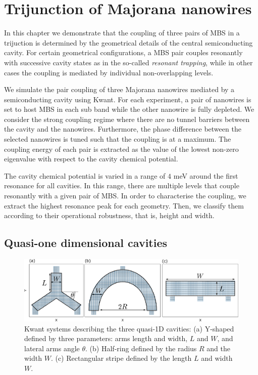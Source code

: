 \chapter{Trijunction of Majorana nanowires}

In this chapter we demonstrate that the coupling of three pairs of MBS in a trijuction is determined by the geometrical details of the central semiconducting cavity.
For certain geometrical configurations, a MBS pair couples resonantly with successive cavity states as in the so-called \textit{resonant trapping}, while in other cases the coupling is mediated by individual non-overlapping levels.

We simulate the pair coupling of three Majorana nanowires mediated by a semiconducting cavity using Kwant\cite{Groth2014}.
For each experiment, a pair of nanowires is set to host MBS in each sub band while the other nanowire is fully depleted.
We consider the strong coupling regime where there are no tunnel barriers between the cavity and the nanowires.
Furthermore, the phase difference between the selected nanowires is tuned such that the coupling is at a maximum.
The coupling energy of each pair is extracted as the value of the lowest non-zero eigenvalue with respect to the cavity chemical potential.

The cavity chemical potential is varied in a range of $4$ meV around the first resonance for all cavities.
In this range, there are multiple levels that couple resonantly with a given pair of MBS.
In order to characterise the coupling, we extract the highest resonance peak for each geometry.
Then, we classify them according to their operational robustness, that is, height and width.

\section{Quasi-one dimensional cavities}

\begin{figure}[h!]
\centering
  \includegraphics[width=0.9\linewidth]{figures/1d_cavities.pdf}
  \caption{Kwant systems describing the three quasi-1D cavities: (a) Y-shaped defined by three parameters: arms length and width, $L$ and $W$, and lateral arms angle $\theta$. (b) Half-ring defined by the radius $R$ and the width $W$. (c) Rectangular stripe defined by the length $L$ and width $W$.}
  \label{fig:1d}
\end{figure}

